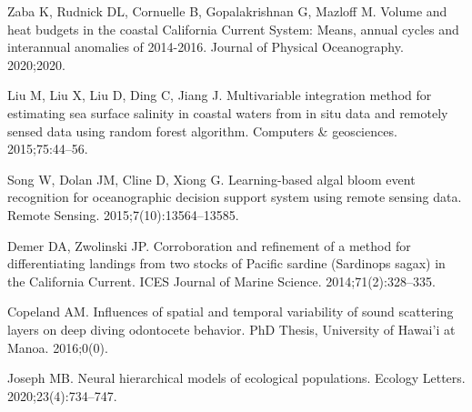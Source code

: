 \documentclass[10pt,letterpaper]{article}
\begin{document}
\begin{thebibliography}{10}
Zaba K, Rudnick DL, Cornuelle B, Gopalakrishnan G, Mazloff M.
\newblock Volume and heat budgets in the coastal California Current System:
  Means, annual cycles and interannual anomalies of 2014-2016.
\newblock Journal of Physical Oceanography. 2020;2020.

Liu M, Liu X, Liu D, Ding C, Jiang J.
\newblock Multivariable integration method for estimating sea surface salinity
  in coastal waters from in situ data and remotely sensed data using random
  forest algorithm.
\newblock Computers \& geosciences. 2015;75:44--56.

Song W, Dolan JM, Cline D, Xiong G.
\newblock Learning-based algal bloom event recognition for oceanographic
  decision support system using remote sensing data.
\newblock Remote Sensing. 2015;7(10):13564--13585.

Demer DA, Zwolinski JP.
\newblock Corroboration and refinement of a method for differentiating landings
  from two stocks of Pacific sardine (Sardinops sagax) in the California
  Current.
\newblock ICES Journal of Marine Science. 2014;71(2):328--335.

Copeland AM.
\newblock Influences of spatial and temporal variability of sound scattering
  layers on deep diving odontocete behavior.
\newblock PhD Thesis, University of Hawai'i at Manoa. 2016;0(0).

Joseph MB.
\newblock Neural hierarchical models of ecological populations.
\newblock Ecology Letters. 2020;23(4):734--747.

\end{thebibliography}
\end{document}
